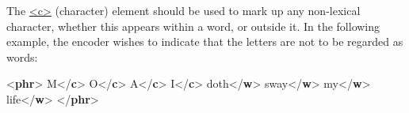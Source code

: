 The \hyperref[TEI.c]{<c>} (character) element should be used to mark up any non-lexical character, whether this appears within a word, or outside it. In the following example, the encoder wishes to indicate that the letters are not to be regarded as words: \par\bgroup{}\exampleFont \begin{shaded}\noindent\mbox{}{<\textbf{phr}>}\mbox{}\newline 
{}M{</\textbf{c}>}\mbox{}\newline 
{}O{</\textbf{c}>}\mbox{}\newline 
{}A{</\textbf{c}>}\mbox{}\newline 
{}I{</\textbf{c}>}\mbox{}\newline 
{}doth{</\textbf{w}>}\mbox{}\newline 
{}sway{</\textbf{w}>}\mbox{}\newline 
{}my{</\textbf{w}>}\mbox{}\newline 
{}life{</\textbf{w}>}\mbox{}\newline 
{</\textbf{phr}>}\end{shaded}\egroup\par \par
